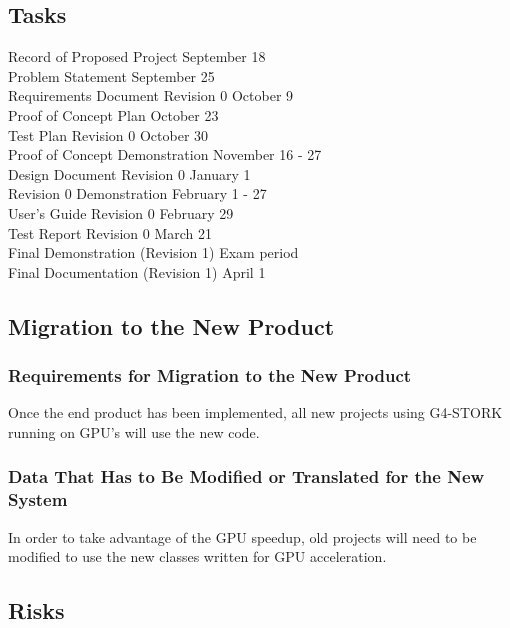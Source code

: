 \documentclass[12pt]{article}
\begin{document}
\subsection{Tasks}\label{SubSec_Tasks} %
Record of Proposed Project \hfill September 18\\
Problem Statement \hfill September 25\\
Requirements Document Revision 0 \hfill October 9\\
Proof of Concept Plan \hfill October 23\\
Test Plan Revision 0 \hfill October 30\\
Proof of Concept Demonstration \hfill November 16 - 27\\
Design Document Revision 0 \hfill January 1\\
Revision 0 Demonstration \hfill February 1 - 27\\
User's Guide Revision 0 \hfill February 29\\
Test Report Revision 0 \hfill March 21\\
Final Demonstration (Revision 1) \hfill Exam period\\
Final Documentation (Revision 1) \hfill April 1

\subsection{Migration to the New Product} %

\subsubsection{Requirements for Migration to the New Product}
Once the end product has been implemented, all new projects using G4-STORK running on GPU's will use the new code.

\subsubsection{Data That Has to Be Modified or Translated for the New System}
In order to take advantage of the GPU speedup, old projects will need to be modified to use the new classes written for GPU acceleration. 

\subsection{Risks} %
\end{document}
